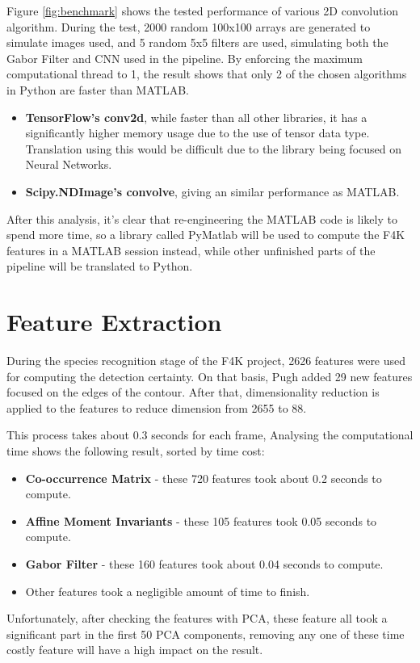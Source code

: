 \documentclass[bsc,frontabs,twoside,fullspacing,parskip,deptreport]{infthesis}
\begin{document}
Figure \ref{fig:benchmark} shows the tested performance of various 2D convolution algorithm. During the test, 2000 random 100x100 arrays are generated to simulate images used, and 5 random 5x5 filters are used, simulating both the Gabor Filter and CNN used in the pipeline. By enforcing the maximum computational thread to 1, the result shows that only 2 of the chosen algorithms in Python are faster than MATLAB.
\begin{itemize}
\setlength{\parskip}{1pt}
\item
\textbf{TensorFlow's conv2d}, while faster than all other libraries, it has a significantly higher memory usage due to the use of tensor data type. Translation using this would be difficult due to the library being focused on Neural Networks.
\item
\textbf{Scipy.NDImage's convolve}, giving an similar performance as MATLAB.
\end{itemize}

After this analysis, it's clear that re-engineering the MATLAB code is likely to spend more time, so a library called PyMatlab will be used to compute the F4K features in a MATLAB session instead, while other unfinished parts of the pipeline will be translated to Python.

\section{Feature Extraction}

During the species recognition stage of the F4K project, 2626 features were used for computing the detection certainty.
On that basis, Pugh added 29 new features focused on the edges of the contour. 
After that, dimensionality reduction is applied to the features to reduce dimension from 2655 to 88.

This process takes about 0.3 seconds for each frame, Analysing the computational time shows the following result, sorted by time cost:
\begin{itemize}
\setlength{\parskip}{1pt}
\item
\textbf{Co-occurrence Matrix} - these 720 features took about 0.2 seconds to compute.
\item
\textbf{Affine Moment Invariants} - these 105 features took 0.05 seconds to compute.
\item
\textbf{Gabor Filter} - these 160 features took about 0.04 seconds to compute.
\item Other features took a negligible amount of time to finish.
\end{itemize}
Unfortunately, after checking the features with PCA, these feature all took a significant part in the first 50 PCA components, removing any one of these time costly feature will have a high impact on the result.
\end{document}
